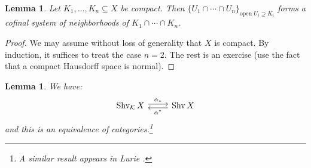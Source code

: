 \documentclass[12pt]{article}
\newtheorem{lemma}[theorem]{Lemma}
\theoremstyle{definition}
\theoremstyle{remark}
\numberwithin{equation}{subsection}
\newcommand{\K}{\mathcal K}
\newcommand{\Shv}{\operatorname{Shv}}
\begin{document}
\begin{lemma}\label{intersectioncofinal}
Let $K_1,\ldots,K_n\subseteq X$ be compact.  Then $\{U_1\cap\cdots\cap U_n\}_{\text{open }U_i\supseteq K_i}$ forms a cofinal system of neighborhoods of $K_1\cap\cdots\cap K_n$.
\end{lemma}

\begin{proof}
We may assume without loss of generality that $X$ is compact.  By induction, it suffices to treat the case $n=2$.  The rest is an exercise (use the fact that a compact Hausdorff space is normal).
\end{proof}

\begin{lemma}\label{opencptshvequivalence}
We have:
\begin{equation}
\begin{tikzcd}\Shv_\K X\ar[yshift=0.5ex]{r}{\alpha_\ast}&\ar[yshift=-0.5ex]{l}{\alpha^\ast}\Shv X\end{tikzcd}
\end{equation}
and this is an equivalence of categories.\footnote{A similar result appears in Lurie \cite[Corollary 7.3.4.10]{luriehtt}.}
\end{lemma}
\end{document}
